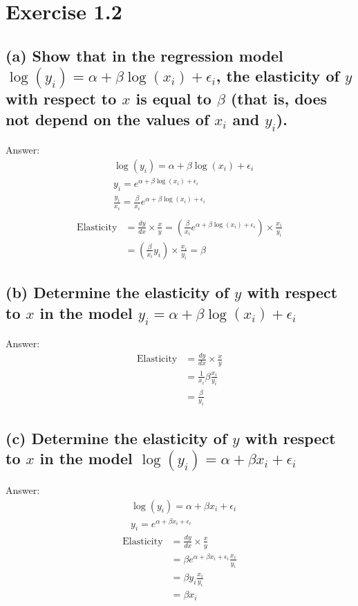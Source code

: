 \documentclass[12pt, a4paper]{article}
\begin{document}
\section*{Exercise 1.2}
\vspace{1em}
\subsection*{(a) Show that in the regression model $\log(y_i) = \alpha+\beta \log(x_i) + \epsilon_i$, the elasticity of $y$ with respect to $x$ is equal to $\beta$ (that is, does not depend on the values of $x_i$ and $y_i$).}
Answer:
\begin{align*}
    &\log(y_i) = \alpha+\beta \log(x_i) + \epsilon_i\\
    &y_i = e^{\alpha+\beta \log(x_i) + \epsilon_i}\\
    &\frac{y_i}{x_i} = \frac{\beta}{x_i}e^{\alpha+\beta \log(x_i) + \epsilon_i}\\
\end{align*}
\begin{align*}
\text{Elasticity}&=\frac{dy}{dx}\times\frac{x}{y} = \left(\frac{\beta}{x_i}e^{\alpha+\beta \log(x_i) + \epsilon_i}\right) \times\frac{x_i}{y_i}\\
&=\left(\frac{\beta}{x_i}y_i\right) \times\frac{x_i}{y_i} = \beta
\end{align*}
\vspace{1em}

\subsection*{ (b) Determine the elasticity of $y$ with respect to $x$ in the model $y_i = \alpha+\beta \log(x_i) + \epsilon_i$}
Answer:
\begin{align*}
    \text{Elasticity}&=\frac{dy}{dx}\times\frac{x}{y}\\
    &= \frac{1}{x_i}\beta \frac{x_i}{y_i}\\
    &= \frac{\beta}{y_i}
\end{align*}
\vspace{1em}

\subsection*{ (c) Determine the elasticity of $y$ with respect to $x$ in the model $\log(y_i) = \alpha+\beta x_i + \epsilon_i$}
Answer:
\begin{align*}
    &\log(y_i) = \alpha+\beta x_i + \epsilon_i\\
    &y_i = e^{\alpha+\beta x_i + \epsilon_i}
\end{align*}
\begin{align*}
    \text{Elasticity}&=\frac{dy}{dx}\times\frac{x}{y}\\
    &= \beta e^{\alpha+\beta x_i + \epsilon_i} \frac{x_i}{y_i}\\
    &= \beta y_i\frac{x_i}{y_i}\\
    &= \beta x_i
\end{align*}
\vspace{1em}
\end{document}
